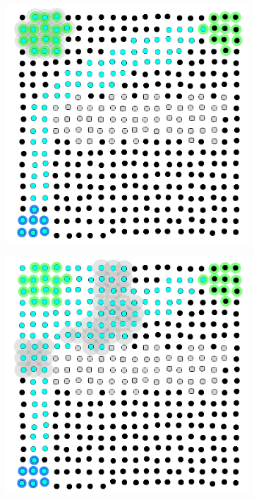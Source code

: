 \begin{figure}
  \centering
  \begin{subfigure}[b]{0.24\linewidth}
      \centering
      \includegraphics[width=\textwidth]{papers/acsos2023-frp/imgs/channel201.0.png}
      \caption{}
      \label{acsos2023-frp:fig:init}
  \end{subfigure}\hfill
  \begin{subfigure}[b]{0.24\linewidth}
      \centering
      \includegraphics[width=\textwidth]{papers/acsos2023-frp/imgs/channel210.0.png}

\end{subfigure}
\end{figure}
